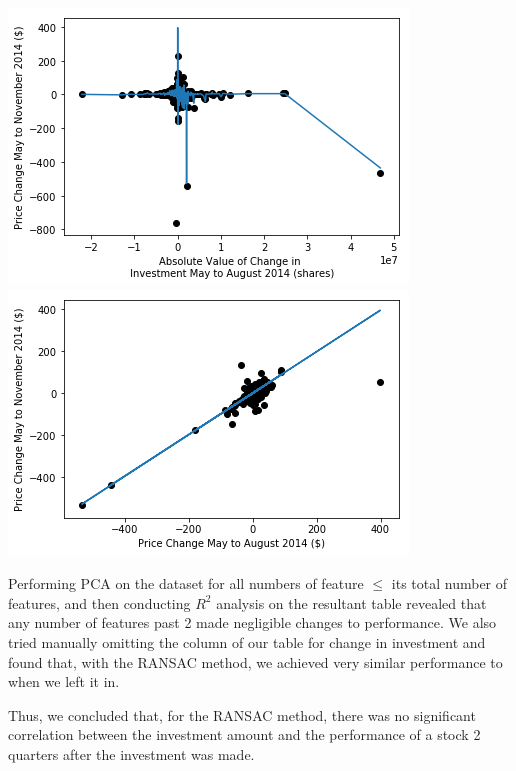 \documentclass{article}
\begin{document}
\begin{multicols}{2}
\begin{center}
\includegraphics[scale = 0.47]{RansacTestByAmt.png}
\includegraphics[scale = 0.47]{RansacTestByPrice.png}
\end{center}
Performing PCA on the dataset for all numbers of feature $\leq$ its total number of features, and then conducting $R^{2}$ analysis on the resultant table revealed that any number of features past 2 made negligible changes to performance. We also tried manually omitting the column of our table for change in investment and found that, with the RANSAC method, we achieved very similar performance to when we left it in. 

Thus, we concluded that, for the RANSAC method, there was no significant correlation between the investment amount and the performance of a stock 2 quarters after the investment was made.
\end{multicols}
\end{document}
